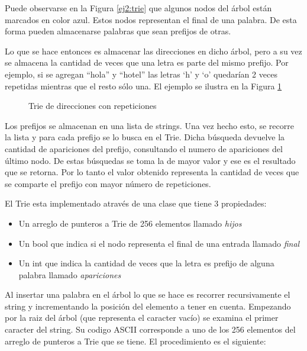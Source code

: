 Puede observarse en la Figura \ref{ej2:trie} que algunos nodos del árbol están
marcados en color azul. Estos nodos representan el final de una palabra. De
esta forma pueden almacenarse palabras que sean prefijos de otras.

Lo que se hace entonces es almacenar las direcciones en dicho árbol, pero a
su vez se almacena la cantidad de veces que una letra es parte del mismo
prefijo. Por ejemplo, si se agregan ``hola'' y ``hotel'' las letras `h' y `o'
quedarían 2 veces repetidas mientras que el resto sólo una. El ejemplo se
ilustra en la Figura \ref{ej2:trie_rep}

\begin{figure}[ht]
	\caption{Trie de direcciones con repeticiones}
	\label{ej2:trie_rep}
	\centering
\end{figure}

Los prefijos se almacenan en una lista de strings. Una vez hecho esto, se
recorre la lista y para cada prefijo se lo busca en el Trie. Dicha búsqueda
devuelve la cantidad de apariciones del prefijo, consultando el numero de
apariciones del último nodo. De estas búsquedas se toma la de mayor valor y
ese es el resultado que se retorna. Por lo tanto el valor obtenido representa
la cantidad de veces que se comparte el prefijo con mayor número de
repeticiones.

El Trie esta implementado através de una clase que tiene 3 propiedades:

\begin{itemize}
\item Un arreglo de punteros a Trie de 256 elementos llamado \textit{hijos}
\item Un bool que indica si el nodo representa el final de una entrada llamado
\textit{final}
\item Un int que indica la cantidad de veces que la letra es prefijo de alguna
palabra llamado \textit{apariciones}
\end{itemize}

Al insertar una palabra en el árbol lo que se hace es recorrer recursivamente
el string y incrementando la posición del elemento a tener en cuenta.
Empezando por la raiz del árbol (que representa el caracter vacío) se examina
el primer caracter del string. Su codigo ASCII corresponde a uno de los 256
elementos del arreglo de punteros a Trie que se tiene. El procedimiento es el
siguiente:

